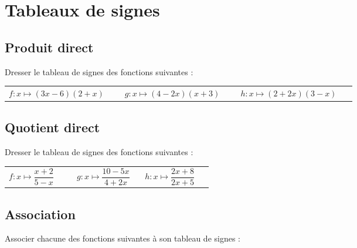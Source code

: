\documentclass[oneside,12pt]{article}          %
\begin{document}
\section{Tableaux de signes}

\subsection{Produit direct}
Dresser le tableau de signes des fonctions suivantes :

\begin{tabular}{p{0.3\linewidth} p{0.3\linewidth} p{0.3\linewidth}}
$f:x\mapsto (3x-6)(2+x)$ & $g:x\mapsto (4-2x)(x+3)$ & $h:x\mapsto (2+2x)(3-x)$
\end{tabular}



\subsection{Quotient direct}
Dresser le tableau de signes des fonctions suivantes :

\begin{tabular}{p{0.3\linewidth} p{0.3\linewidth} p{0.3\linewidth}}
$f:x\mapsto \dfrac{x+2}{5-x}$ & $g:x\mapsto \dfrac{10-5x}{4+2x}$ & $h:x\mapsto \dfrac{2x+8}{2x+5}$
\end{tabular}



\subsection{Association}
Associer chacune des fonctions suivantes à son tableau de signes :
\end{document}
